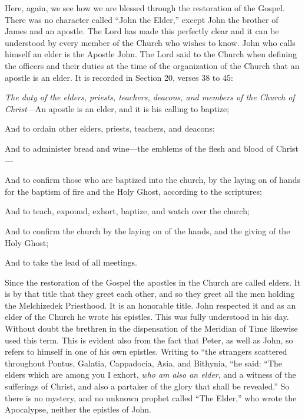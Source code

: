 Here, again, we see how we are blessed through the restoration of the Gospel. There was no
character called ``John the Elder,'' except John the brother of James and an apostle. The Lord
has made this perfectly clear and it can be understood by every member of the Church who
wishes to know. John who calls himself an elder is the Apostle John. The Lord said to the
Church when defining the officers and their duties at the time of the organization of the
Church that an apostle is an elder. It is recorded in Section 20, verses 38 to 45:

\textit{The duty of the elders, priests, teachers, deacons, and members of the Church of Christ}—An
apostle is an elder, and it is his calling to baptize;

And to ordain other elders, priests, teachers, and deacons;

And to administer bread and wine—the emblems of the flesh and blood of Christ—

And to confirm those who are baptized into the church, by the laying on of hands for the
baptism of fire and the Holy Ghost, according to the scriptures;

And to teach, expound, exhort, baptize, and watch over the church;

And to confirm the church by the laying on of the hands, and the giving of the Holy Ghost;

And to take the lead of all meetings.

Since the restoration of the Gospel the apostles in the Church are called elders. It is by that
title that they greet each other, and so they greet all the men holding the Melchizedek
Priesthood. It is an honorable title. John respected it and as an elder of the Church he wrote
his epistles. This was fully understood in his day. Without doubt the brethren in the
dispensation of the Meridian of Time likewise used this term. This is evident also from the
fact that Peter, as well as John, so refers to himself in one of his own epistles. Writing to ``the
strangers scattered throughout Pontus, Galatia, Cappadocia, Asia, and Bithynia, ``he said:
``The elders which are among you I exhort, \textit{who am also an elder}, and a witness of the
sufferings of Christ, and also a partaker of the glory that shall be revealed.'' So there is no
mystery, and no unknown prophet called ``The Elder,'' who wrote the Apocalypse, neither the
epistles of John.


